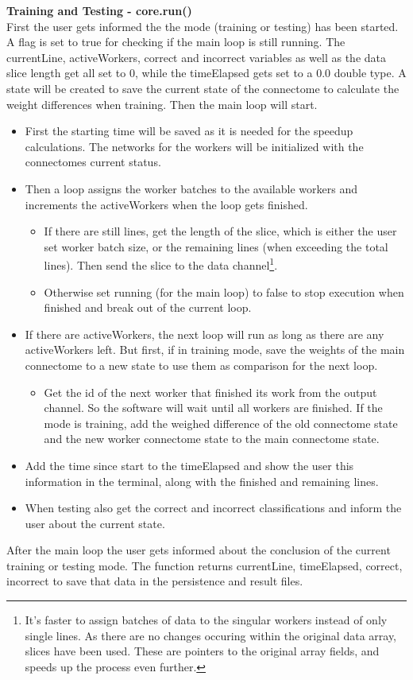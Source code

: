 \documentclass[11pt]{article}
\begin{document}
\textbf{Training and Testing - core.run()}\\
First the user gets informed the the mode (training or testing) has been started. A flag is set to true for checking if the main loop is still running. The currentLine, activeWorkers, correct and incorrect variables as well as the data slice length get all set to 0, while the timeElapsed gets set to a 0.0 double type. A state will be created to save the current state of the connectome to calculate the weight differences when training. Then the main loop will start.
\begin{itemize}
\item First the starting time will be saved as it is needed for the speedup calculations. The networks for the workers will be initialized with the connectomes current status.
\item Then a loop assigns the worker batches to the available workers and increments the activeWorkers when the loop gets finished.
\begin{itemize}
\item If there are still lines, get the length of the slice, which is either the user set worker batch size, or the remaining lines (when exceeding the total lines). Then send the slice to the data channel\footnote{It's faster to assign batches of data to the singular workers instead of only single lines. As there are no changes occuring within the original data array, slices have been used. These are pointers to the original array fields, and speeds up the process even further.}.
\item Otherwise set running (for the main loop) to false to stop execution when finished and break out of the current loop.
\end{itemize}
\item If there are activeWorkers, the next loop will run as long as there are any activeWorkers left. But first, if in training mode, save the weights of the main connectome to a new state to use them as comparison for the next loop.
\begin{itemize}
\item Get the id of the next worker that finished its work from the output channel. So the software will wait until all workers are finished. If the mode is training, add the weighed difference of the old connectome state and the new worker connectome state to the main connectome state.
\end{itemize}
\item Add the time since start to the timeElapsed and show the user this information in the terminal, along with the finished and remaining lines.
\item When testing also get the correct and incorrect classifications and inform the user about the current state.
\end{itemize}
After the main loop the user gets informed about the conclusion of the current training or testing mode. The function returns currentLine, timeElapsed, correct, incorrect to save that data in the persistence and result files.
\end{document}
